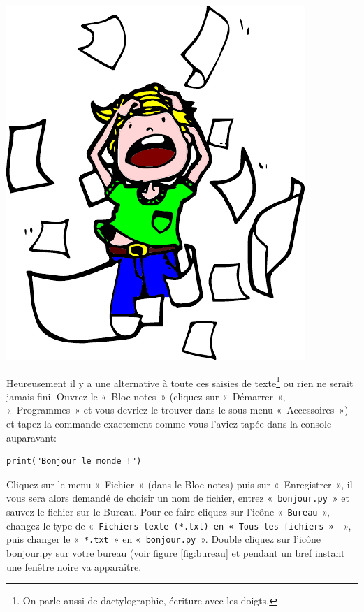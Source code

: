 \begin{center}
\includegraphics[scale=1]{images/encore.pdf} 
\end{center} 

Heureusement il y a une alternative à toute ces saisies de texte\footnote{On parle aussi de dactylographie, écriture avec les doigts.} ou rien ne serait jamais fini.
Ouvrez le «~Bloc-notes~» (cliquez sur «~Démarrer~», «~Programmes~» et vous devriez le trouver dans le sous menu «~Accessoires~») et tapez la commande exactement comme vous l'aviez tapée dans la console auparavant:

\begin{Verbatim}[frame=single,rulecolor=\color{gray}, label=ne pas saisir]
print("Bonjour le monde !")
\end{Verbatim}
\rm

Cliquez sur le menu «~Fichier~» (dans le Bloc-notes) puis sur «~Enregistrer~», il vous sera alors demandé de choisir un nom de fichier, entrez «~\texttt{bonjour.py}~» et sauvez le fichier sur le Bureau. Pour ce faire cliquez sur l'icône «~\texttt{Bureau}~», changez le type de «~\texttt{Fichiers texte (*.txt) en «~\texttt{Tous les fichiers}~» }~», puis changer le «~\texttt{*.txt}~» en «~\texttt{bonjour.py}~». Double cliquez sur l'icône bonjour.py sur votre bureau (voir figure \ref{fig:bureau} et pendant un bref instant une fenêtre noire va apparaître.

